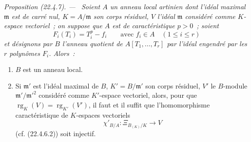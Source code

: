 \documentclass[10pt,oneside]{book}
\makeatletter
\newcommand{\setmanualcurrentlabel}[1]{\def\@currentlabel{#1}}
\newenvironment{proposition}[1][]{%
  \setmanualcurrentlabel{#1}\par\medskip\noindent\itshape Proposition (#1). ---\ }{\par}
\makeatother
\begin{document}
\begin{proposition}[22.4.7]
\label{0.22.4.7-fr}
Soient $A$ un anneau local artinien dont l'idéal maximal $\mathfrak m$ est de
carré nul, $K=A/\mathfrak m$ son corps résiduel, $V$ l'idéal $\mathfrak m$
considéré comme $K$-espace vectoriel~; on suppose que $A$ est de
caractéristique $p>0$~; soient
\begin{equation}
\label{0.22.4.7.1-fr}
  F_i(T_i)=T_i^p-f_i\qquad\text{avec }f_i\in A\quad(1\leqslant i\leqslant r)
  \tag{22.4.7.1}
\end{equation}
et désignons par $B$ l'anneau quotient de $A[T_1,\ldots,T_r]$ par l'idéal
engendré par les $r$ polynômes $F_i$. Alors~:
\begin{enumerate}
  \item[\rm(i)] $B$ est un anneau local.
  \item[\rm(ii)] Si $\mathfrak m'$ est l'idéal maximal de $B$,
  $K'=B/\mathfrak m'$ son corps résiduel, $V'$ le $B$-module
  $\mathfrak m'/\mathfrak m'^2$ considéré comme $K'$-espace vectoriel, alors,
  pour que $\operatorname{rg}_K(V)=\operatorname{rg}_{K'}(V')$, il faut et il suffit que l'homomorphisme
  caractéristique de $K$-espaces vectoriels
  \begin{equation}
  \label{0.22.4.7.2-fr}
    \chi'_{B/A}:\Xi_{B_{(K)}/K}\longrightarrow V
    \tag{22.4.7.2}
  \end{equation}
  (cf. (22.4.6.2)) soit injectif.
\end{enumerate}
\end{proposition}
\end{document}
